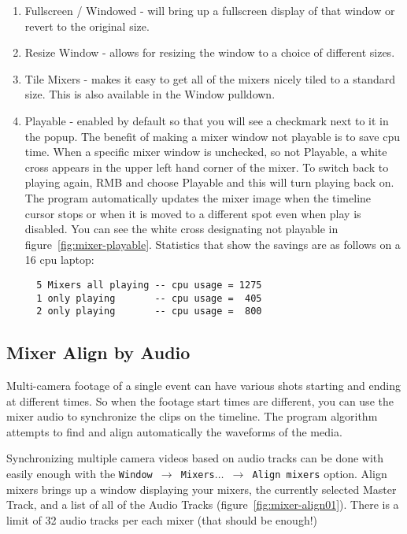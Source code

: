 \begin{enumerate}
    \item Fullscreen / Windowed - will bring up a fullscreen display of that window or revert to the original size.
    \item Resize Window - allows for resizing the window to a choice of different sizes.
    \item Tile Mixers - makes it easy to get all of the mixers nicely tiled to a standard size.
This is also available in the Window pulldown.
    \item Playable - enabled by default so that you will see a checkmark next to it in the 
popup.  The benefit of making a mixer window not playable is to save cpu time. When a specific
mixer window is unchecked, so not Playable, a white cross appears in the upper left hand corner
of the mixer.  To switch back to playing again, RMB and choose Playable and this will turn
playing back on. The program automatically updates the mixer image when the timeline cursor
stops or when it is moved to a different spot even when play is disabled. You can see the
white cross designating not playable in figure~\ref{fig:mixer-playable}. Statistics that show
the savings are as follows on a 16 cpu laptop:
\begin{verbatim}
  5 Mixers all playing -- cpu usage = 1275
  1 only playing       -- cpu usage =  405
  2 only playing       -- cpu usage =  800
\end{verbatim}
\end{enumerate}

\subsection{Mixer Align by Audio}%
\label{sub:mixer_align_audio}

Multi-camera footage of a single event can have various shots starting and ending at different times. So when the footage start times are different, you can use the mixer audio to synchronize the clips on the timeline. The program algorithm attempts to find and align automatically the waveforms of the media.

Synchronizing multiple camera videos based on audio tracks can be done with \CGG{} easily enough with the \texttt{Window $\rightarrow$ Mixers$\dots$ $\rightarrow$  Align mixers} option.  Align mixers brings up a window displaying your mixers, the currently selected Master Track, and a list of all of the Audio Tracks (figure~\ref{fig:mixer-align01}).  There is a limit of 32 audio tracks per each mixer (that should be enough!)

